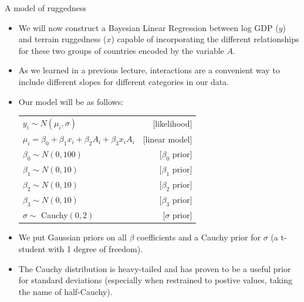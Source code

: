 \documentclass[handout]{beamer}
\begin{document}
\begin{frame}{A model of ruggedness}
\scriptsize{

\begin{itemize}
\item We will now construct a Bayesian Linear Regression between log GDP ($y$) and terrain ruggedness ($x$) capable of incorporating the different relationships for these two groups of countries encoded by the variable $A$.
\item As we learned in a previous lecture, interactions are a convenient way to include different slopes for different categories in our data.
\item Our model will be as follows:

 \vspace{0.3cm}
 \begin{table}
 \centering
 \begin{tabular}{lr}  
$y_i \sim N(\mu_i,\sigma)$ & [likelihood] \\
$\mu_i = \beta_0 + \beta_1 x_i+ \beta_2 A_i+\beta_3x_iA_i$ & [linear model] \\
$\beta_0 \sim N(0,100)$ & [$\beta_0$ prior] \\
$\beta_1 \sim N(0,10)$ & [$\beta_1$ prior] \\
$\beta_2 \sim N(0,10)$ & [$\beta_2$ prior] \\
$\beta_3 \sim N(0,10)$ & [$\beta_3$ prior] \\
$\sigma \sim $ Cauchy$(0,2)$ & [$\sigma$ prior] \\
\end{tabular}
\end{table}

\item We put Gaussian priors on all $\beta$ coefficients and a Cauchy prior for $\sigma$ (a t-student with 1 degree of freedom).

\item The Cauchy distribution is heavy-tailed and has proven to be a useful prior for standard deviations (especially when restrained to postive values, taking the name of half-Cauchy). 

\end{itemize}




} 
\end{frame}
\end{document}
